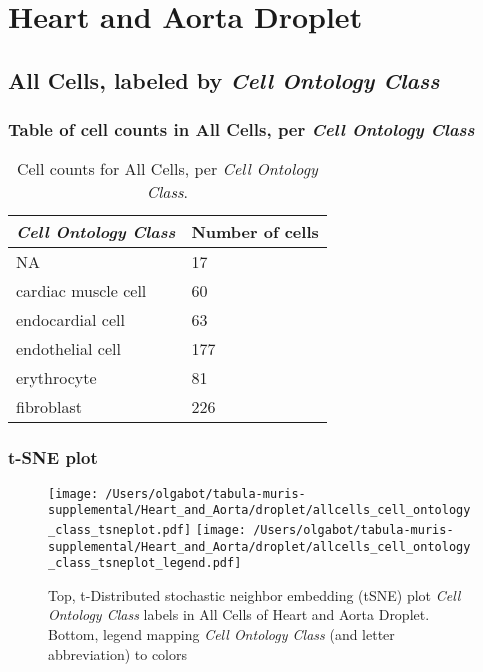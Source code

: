 \clearpage
\section{Heart and Aorta Droplet}

\subsection{All Cells, labeled by \emph{Cell Ontology Class}}
\subsubsection{Table of cell counts in All Cells, per \emph{Cell Ontology Class}}\begin{table}[h]
\centering
\label{my-label}
\begin{tabular}{@{}ll@{}}
\toprule

\emph{Cell Ontology Class}& Number of cells \\ \midrule
NA & 17 \\

cardiac muscle cell & 60 \\

endocardial cell & 63 \\

endothelial cell & 177 \\

erythrocyte & 81 \\

fibroblast & 226 \\
\bottomrule
\end{tabular}
\caption{Cell counts for All Cells, per \emph{Cell Ontology Class}.}
\end{table}

\clearpage
\subsubsection{t-SNE plot}
\begin{figure}[h]
\centering
\texttt{[image: /Users/olgabot/tabula-muris-supplemental/Heart\_and\_Aorta/droplet/allcells\_cell\_ontology\_class\_tsneplot.pdf]}
\texttt{[image: /Users/olgabot/tabula-muris-supplemental/Heart\_and\_Aorta/droplet/allcells\_cell\_ontology\_class\_tsneplot\_legend.pdf]}
\caption{Top, t-Distributed stochastic neighbor embedding (tSNE) plot  \emph{Cell Ontology Class} labels in All Cells of Heart and Aorta Droplet. Bottom, legend mapping \emph{Cell Ontology Class} (and letter abbreviation) to colors}
\end{figure}


